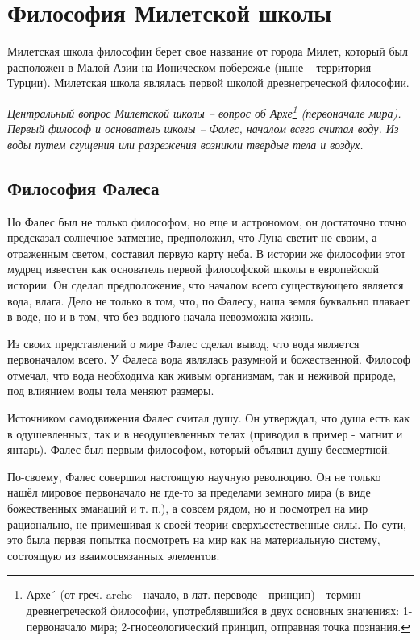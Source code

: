 \chapter{Философия Милетской школы}

Милетская школа философии берет свое название от города Милет, который был расположен в Малой Азии на Ионическом побережье (ныне -- территория Турции). Милетская школа являлась первой школой древнегреческой философии.

\emph{Центральный вопрос Милетской школы -- вопрос об Архе\footnote{Архе´
    (от греч. arche - начало, в лат. переводе - принцип) - термин
    древнегреческой философии, употреблявшийся в двух основных значениях:
    1-первоначало мира; 2-гносеологический принцип, отправная точка
    познания.} (первоначале мира). Первый философ и основатель школы --
  Фалес, началом всего считал воду. Из воды путем сгущения или разрежения
  возникли твердые тела и воздух.}

\section{Философия Фалеса}

Но Фалес был не только философом, но еще и астрономом, он достаточно
точно пред­сказал солнечное затмение, предположил, что Луна светит не
своим, а отраженным светом, составил первую карту неба. В ис­тории же
философии этот мудрец известен как основатель пер­вой философской школы
в европейской истории. Он сделал предположение, что началом всего
существующего является вода, влага. Дело не только в том, что, по
Фалесу, наша земля буквально плавает в воде, но и в том, что без водного
начала невозможна жизнь.

Из своих представлений о мире Фалес сделал вывод, что вода является
первоначалом всего. У Фалеса вода являлась разумной и божественной.
Философ отмечал, что вода необходима как живым организмам, так и неживой
природе, под влиянием воды тела меняют размеры.

Источником самодвижения Фалес считал душу. Он утверждал, что душа есть
как в одушевленных, так и в неодушевленных телах (приводил в пример -
магнит и янтарь). Фалес был первым философом, который объявил душу
бессмертной.

По-своему, Фалес совершил настоящую научную революцию. Он не только
нашёл мировое первоначало не где-то за пределами земного мира (в виде
божественных эманаций и т. п.), а совсем рядом, но и посмотрел на мир
рационально, не примешивая к своей теории сверхъестественные силы. По
сути, это была первая попытка посмотреть на мир как на материальную
систему, состоящую из взаимосвязанных элементов.


